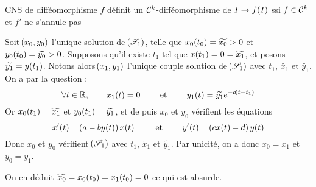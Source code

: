 \documentclass[a4paper,french,bookmarks]{article}
\begin{document}
    \begin{property}{CNS de difféomorphisme}{}
        $f$ définit un $\mathcal{C}^k$-difféomorphisme de $I \rightarrow f\!\left(I\right)$ ssi $f \in \mathcal{C}^k$ et $f'$ ne s'annule pas
    \end{property}
    
    \newpage
    
    Soit $\!\left(x_0, y_0\right)$ l'unique solution de $\!\left(\mathscr{S}_1\right)$, telle que $x_0\!\left(t_0\right) = \widetilde{x_0} > 0$ et $y_0\!\left(t_0\right) = \widetilde{y_0} > 0$. Supposons qu'il existe $t_1$ tel que $x\!\left(t_1\right) = 0 = \widetilde{x_1}$, et posons $\widetilde{y_1} = y\!\left(t_1\right)$. Notons alors $\!\left(x_1, y_1\right)$ l'unique couple solution de $\!\left(\mathscr{S}_1\right)$ avec $t_1$, $\widetilde{x_1}$ et $\widetilde{y_1}$. On a par la question  :
    \[ \forall t \in \mathbb{R},\qquad x_1\!\left(t\right) = 0 \qquad\ \text{et} \ \qquad y_1\!\left(t\right) = \widetilde{y_1}e^{-d\!\left(t - t_1\right)}\]
    Or $x_0\!\left(t_1\right) = \widetilde{x_1}$ et $y_0\!\left(t_1\right) = \widetilde{y_1}$, et de puis $x_0$ et $y_0$ vérifient les équations 
    \[ x'\p{t} = \p{a - by\p{t}}x\p{t} \qquad\et\qquad y'\p{t} = \p{cx\p{t} - d}y\p{t}\]
    Donc $x_0$ et $y_0$ vérifient $\!\left(\mathscr{S}_1\right)$ avec $t_1$, $\widetilde{x_1}$ et $\widetilde{y_1}$. Par unicité, on a donc $x_0 = x_1$ et $y_0 = y_1$.
    
    On en déduit $\widetilde{x_0} = x_0\!\left(t_0\right) = x_1\!\left(t_0\right) = 0$ ce qui est absurde.
    
    
    
    
\end{document}
